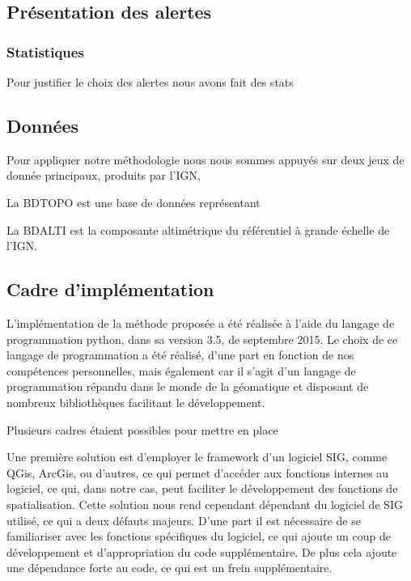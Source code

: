 

\subsection{Présentation des alertes}

\subsubsection{Statistiques}

Pour justifier le choix des alertes nous avons fait des stats 

\subsection{Données}

Pour appliquer notre méthodologie nous nous sommes appuyés sur deux
jeux de donnée principaux, produits par l'IGN,

La BDTOPO est une base de données représentant

La BDALTI est la composante altimétrique du référentiel à grande
échelle de l'IGN.

\subsection{Cadre d'implémentation}

L'implémentation de la méthode proposée a été réalisée à l'aide du
langage de programmation python, dans sa version 3.5, de septembre
2015. Le choix de ce langage de programmation a été réalisé, d'une
part en fonction de nos compétences personnelles, mais également car
il s'agit d'un langage de programmation répandu dans le monde de la
géomatique et disposant de nombreux bibliothèques facilitant le
développement.

Plusieurs cadres étaient possibles pour mettre en place

Une première solution est d'employer le framework d'un logiciel SIG,
comme QGis, ArcGis, ou d'autres, ce qui permet d’accéder aux fonctions
internes au logiciel, ce qui, dans notre cas, peut faciliter le
développement des fonctions de spatialisation. Cette solution nous
rend cependant dépendant du logiciel de SIG utilisé, ce qui a deux
défauts majeurs. D'une part il est nécessaire de se familiariser avec
les fonctions spécifiques du logiciel, ce qui ajoute un coup de
développement et d'appropriation du code supplémentaire. De plus cela
ajoute une dépendance forte au code, ce qui est un frein
supplémentaire.

